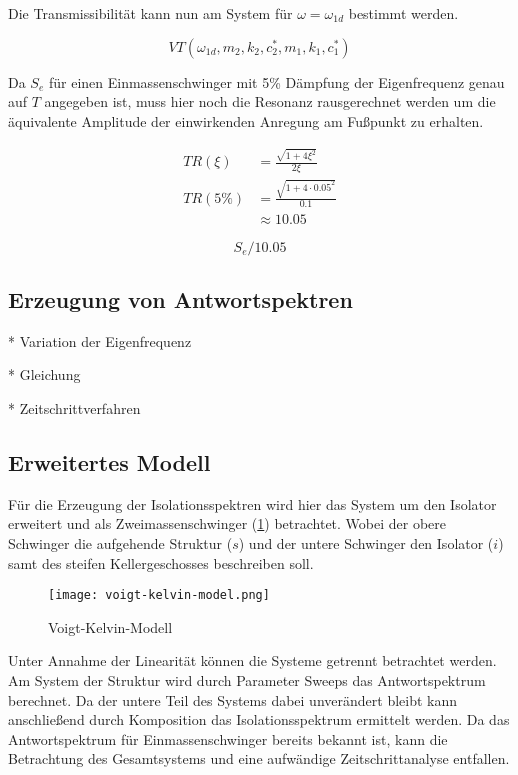 Die Transmissibilität kann nun am System für $\omega = \omega_{1d}$ bestimmt werden.

\begin{equation}
VT(\omega_{1d}, m_2, k_2, c_2^*, m_1, k_1, c_1^*)
\end{equation}

Da $S_e$ für einen Einmassenschwinger mit 5\% Dämpfung der Eigenfrequenz genau auf $T$ angegeben ist, muss hier noch die Resonanz rausgerechnet werden um die äquivalente Amplitude der einwirkenden Anregung am Fußpunkt zu erhalten.

\begin{align*}
TR(\xi) &= \frac{\sqrt{1 + 4 \xi ^2}}{2 \xi}\\
TR(5\%) &= \frac{\sqrt{1 + 4 \cdot 0.05^2}}{0.1}\\
        &\approx 10.05
\end{align*}

\begin{equation}
S_e / 10.05
\end{equation}

\subsection{Erzeugung von Antwortspektren}

* Variation der Eigenfrequenz

* Gleichung

* Zeitschrittverfahren

\subsection{Erweitertes Modell}

Für die Erzeugung der Isolationsspektren wird hier das System um den Isolator erweitert und als Zweimassenschwinger (\cref{fig:vkm}) betrachtet.
Wobei der obere Schwinger die aufgehende Struktur ($s$) und der untere Schwinger den Isolator ($i$) samt des steifen Kellergeschosses beschreiben soll.

\begin{figure}[ht]
    \centering
    \texttt{[image: voigt-kelvin-model.png]}
    \caption{Voigt-Kelvin-Modell}
    \label{fig:vkm}
\end{figure}

Unter Annahme der Linearität können die Systeme getrennt betrachtet werden. Am System der Struktur wird durch Parameter Sweeps das Antwortspektrum berechnet. Da der untere Teil des Systems dabei unverändert bleibt kann anschließend durch Komposition das Isolationsspektrum ermittelt werden.
Da das Antwortspektrum für Einmassenschwinger bereits bekannt ist, kann die Betrachtung des Gesamtsystems und eine aufwändige Zeitschrittanalyse entfallen.


